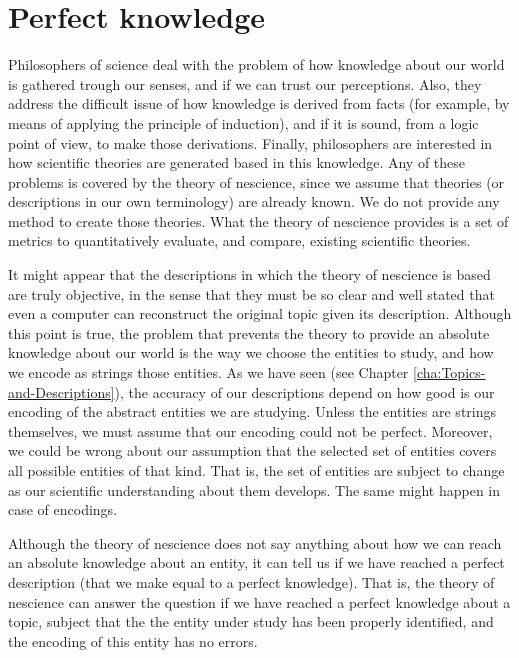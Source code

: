 %
%
\section{Perfect knowledge}

Philosophers of science deal with the problem of how knowledge about our world is gathered trough our senses, and if we can trust our perceptions. Also, they address the difficult issue of how knowledge is derived from facts (for example, by means of applying the principle of induction), and if it is sound, from a logic point of view, to make those derivations. Finally, philosophers are interested in how scientific theories are generated based in this knowledge. Any of these problems is covered by the theory of nescience, since we assume that theories (or descriptions in our own terminology) are already known. We do not provide any method to create those theories. What the theory of nescience provides is a set of metrics to quantitatively evaluate, and compare, existing scientific theories. 

It might appear that the descriptions in which the theory of nescience is based are truly objective, in the sense that they must be so clear and well stated that even a computer can reconstruct the original topic given its description. Although this point is true, the problem that prevents the theory to provide an absolute knowledge about our world is the way we choose the entities to study, and how we encode as strings those entities. As we have seen (see Chapter \ref{cha:Topics-and-Descriptions}), the accuracy of our descriptions depend on how good is our encoding of the abstract entities we are studying. Unless the entities are strings themselves, we must assume that our encoding could not be perfect. Moreover, we could be wrong about our assumption that the selected set of entities covers all possible entities of that kind. That is, the set of entities are subject to change as our scientific understanding about them develops. {\color{red} The same might happen in case of encodings.}

Although the theory of nescience does not say anything about how we can reach an absolute knowledge about an entity, it can tell us if we have reached a perfect description (that we make equal to a perfect knowledge). That is, the theory of nescience can answer the question if we have reached a perfect knowledge about a topic, subject that the the entity under study has been properly identified, and the encoding of this entity has no errors.

